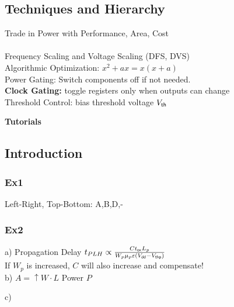 \begin{sectionbox}
	\subsection{Techniques and Hierarchy}
	Trade in Power with Performance, Area, Cost\\
	\\
	Frequency Scaling and Voltage Scaling (DFS, DVS) \\
	Algorithmic Optimization: $x^2 + ax = x(x+a)$\\
	Power Gating: Switch components off if not needed.\\
	\textbf{Clock Gating:} toggle registers only when outputs can change\\
	Threshold Control: bias threshold voltage $V_{\sf th}$
\end{sectionbox}








\columnbreak


{\huge\bf Tutorials}

\begin{sectionbox}
	\subsection{Introduction}
	
		\subsubsection{Ex1}
			Left-Right, Top-Bottom: A,B,D,-  
	
		\subsubsection{Ex2}
			a) Propagation Delay $t_{PLH} \propto \frac{C t_{\sf ox} L_p}{W_p \mu_p \varepsilon (V_{\sf dd} - V_{\sf thp})}$\\
			If $W_p$ is increased, $C$ will also increase and compensate!\\
			b) $A = \uparrow W \cdot L$			%
				Power $P$ 
			
			c)
\end{sectionbox}

